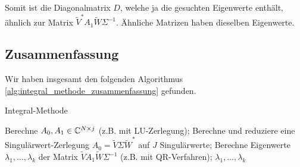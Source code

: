 Somit ist die Diagonalmatrix $D$, welche ja die gesuchten Eigenwerte enthält, ähnlich zur Matrix $\tilde V^\ast A_1 \tilde W \Sigma^{-1}$.
Ähnliche Matrizen haben dieselben Eigenwerte.

\subsection*{Zusammenfassung}

Wir haben insgesamt den folgenden Algorithmus \ref{alg:integral_methode_zusammenfassung} gefunden.

\begin{algorithm}[H]
	\label{alg:integral_methode_zusammenfassung}
	\caption{Integral-Methode}
    \begin{algorithmic}[1]
            \State Berechne $A_0, A_1 \in \mathbb{C}^{N \times j}$ (z.B. mit LU-Zerlegung);
            \State Berechne und reduziere eine Singulärwert-Zerlegung $A_0 = \tilde V \Sigma \tilde W^\ast$ auf $J$ Singulärwerte;
            \State Berechne Eigenwerte $\lambda_1, \dots, \lambda_k$ der Matrix $\tilde V A_1 \tilde W \Sigma^{-1}$ (z.B. mit QR-Verfahren);
            \State \Return $\lambda_1, \dots, \lambda_k$
		\EndProcedure
	\end{algorithmic}
\end{algorithm}

